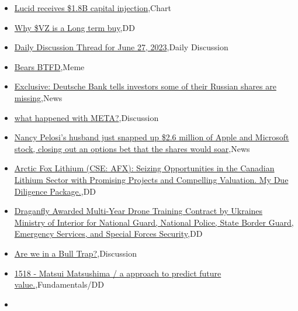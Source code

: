 \documentclass{article}%
\begin{document}
%
\begin{itemize}%
\item%
\href{https://reddit.com/r/wallstreetbets/comments/14kbqbt/lucid\_receives\_18b\_capital\_injection/}{Lucid receives \$1.8B capital injection},Chart%
\item%
\href{https://reddit.com/r/wallstreetbets/comments/14kbejv/why\_vz\_is\_a\_long\_term\_buy/}{Why \$VZ is a Long term buy},DD%
\item%
\href{https://reddit.com/r/wallstreetbets/comments/14k9dbj/daily\_discussion\_thread\_for\_june\_27\_2023/}{Daily Discussion Thread for June 27, 2023},Daily Discussion%
\item%
\href{https://reddit.com/r/wallstreetbets/comments/14k5ahg/bears\_btfd/}{Bears  BTFD},Meme%
\item%
\href{https://reddit.com/r/wallstreetbets/comments/14k3uen/exclusive\_deutsche\_bank\_tells\_investors\_some\_of/}{Exclusive: Deutsche Bank tells investors some of their Russian shares are missing},News%
\item%
\href{https://reddit.com/r/wallstreetbets/comments/14k1wg3/what\_happened\_with\_meta/}{what happened with META?},Discussion%
\item%
\href{https://reddit.com/r/wallstreetbets/comments/14k1mn0/nancy\_pelosis\_husband\_just\_snapped\_up\_26\_million/}{Nancy Pelosi's husband just snapped up \$2.6 million of Apple and Microsoft stock, closing out an options bet that the shares would soar},News%
\item%
\href{https://reddit.com/r/Baystreetbets/comments/14jku5c/arctic\_fox\_lithium\_cse\_afx\_seizing\_opportunities/}{Arctic Fox Lithium (CSE: AFX): Seizing Opportunities in the Canadian Lithium Sector with Promising Projects and Compelling Valuation. My Due Diligence Package.},DD%
\item%
\href{https://reddit.com/r/Baystreetbets/comments/14jjvy9/draganfly\_awarded\_multiyear\_drone\_training/}{Draganfly Awarded Multi-Year Drone Training Contract by Ukraines Ministry of Interior for National Guard, National Police, State Border Guard, Emergency Services, and Special Forces Security},DD%
\item%
\href{https://reddit.com/r/StockMarket/comments/14jzuk0/are\_we\_in\_a\_bull\_trap/}{Are we in a Bull Trap?},Discussion%
\item%
\href{https://reddit.com/r/StockMarket/comments/14juhej/1518\_matsui\_matsushima\_a\_approach\_to\_predict/}{1518 - Matsui Matsushima / a approach to predict future value.},Fundamentals/DD%
\item%

\end{itemize}
\end{document}
